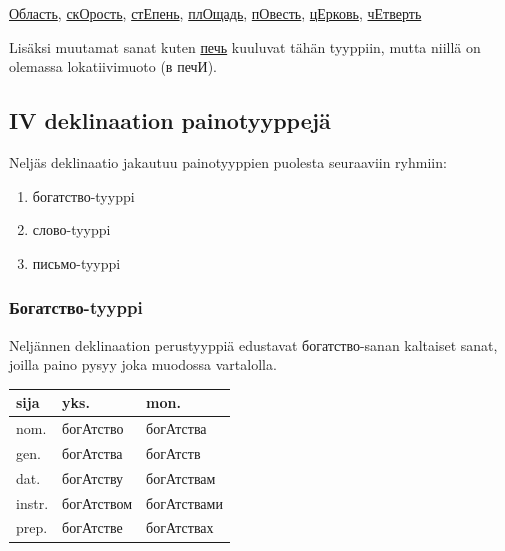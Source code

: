 \documentclass[]{scrreprt}
\providecommand{\tightlist}{%
  \setlength{\itemsep}{0pt}\setlength{\parskip}{0pt}}
\begin{document}
\begin{enumerate}
  \href{http://ru.wiktionary.org/wiki/\%D0\%BE\%D0\%B1\%D0\%BB\%D0\%B0\%D1\%81\%D1\%82\%D1\%8C}{Область},
  \href{http://ru.wiktionary.org/wiki/\%D1\%81\%D0\%BA\%D0\%BE\%D1\%80\%D0\%BE\%D1\%81\%D1\%82\%D1\%8C}{скОрость},
  \href{http://ru.wiktionary.org/wiki/\%D1\%81\%D1\%82\%D0\%B5\%D0\%BF\%D0\%B5\%D0\%BD\%D1\%8C}{стЕпень},
  \href{http://ru.wiktionary.org/wiki/\%D0\%BF\%D0\%BB\%D0\%BE\%D1\%89\%D0\%B0\%D0\%B4\%D1\%8C}{плОщадь},
  \href{http://ru.wiktionary.org/wiki/\%D0\%BF\%D0\%BE\%D0\%B2\%D0\%B5\%D1\%81\%D1\%82\%D1\%8C}{пОвесть},
  \href{http://ru.wiktionary.org/wiki/\%D1\%86\%D0\%B5\%D1\%80\%D0\%BA\%D0\%BE\%D0\%B2\%D1\%8C}{цЕрковь},
  \href{http://ru.wiktionary.org/wiki/\%D1\%87\%D0\%B5\%D1\%82\%D0\%B2\%D0\%B5\%D1\%80\%D1\%82\%D1\%8C}{чЕтверть}
\end{enumerate}

Lisäksi muutamat sanat kuten
\href{http://ru.wiktionary.org/wiki/\%D0\%BF\%D0\%B5\%D1\%87\%D1\%8C}{печь}
kuuluvat tähän tyyppiin, mutta niillä on olemassa lokatiivimuoto (в
печИ).

\subsection{IV deklinaation
painotyyppejä}\label{iv-deklinaation-painotyyppejuxe4}

Neljäs deklinaatio jakautuu painotyyppien puolesta seuraaviin ryhmiin:

\begin{enumerate}
\def\labelenumi{\arabic{enumi}.}
\tightlist
\item
  богатство-tyyppi
\item
  слово-tyyppi
\item
  письмо-tyyppi
\end{enumerate}

\subsubsection{Богатство-tyyppi}\label{ux431ux43eux433ux430ux442ux441ux442ux432ux43e-tyyppi}

Neljännen deklinaation perustyyppiä edustavat богатство-sanan kaltaiset
sanat, joilla paino pysyy joka muodossa vartalolla.

\begin{longtable}[c]{@{}lll@{}}
\toprule
sija & yks. & mon.\tabularnewline
\midrule
\endhead
nom. & богАтство & богАтства\tabularnewline
gen. & богАтства & богАтств\tabularnewline
dat. & богАтству & богАтствам\tabularnewline
instr. & богАтством & богАтствами\tabularnewline
prep. & богАтстве & богАтствах\tabularnewline
\bottomrule
\end{longtable}
\end{document}

